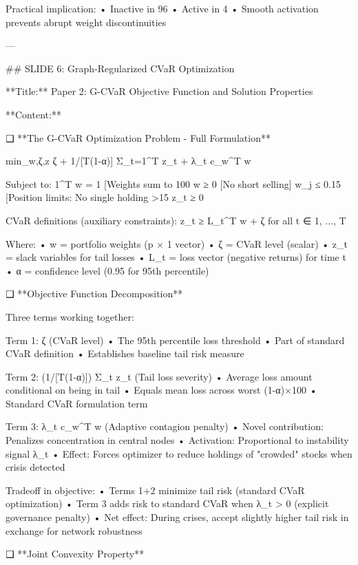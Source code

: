 Practical implication:
   • Inactive in 96%
   • Active in 4%
   • Smooth activation prevents abrupt weight discontinuities

---

## SLIDE 6: Graph-Regularized CVaR Optimization

**Title:** Paper 2: G-CVaR Objective Function and Solution Properties

**Content:**

❑ **The G-CVaR Optimization Problem - Full Formulation**

min_{w,ζ,z} ζ + 1/[T(1-α)] Σ_{t=1}^T z_t + λ_t c_w^T w

Subject to:
   1^T w = 1  [Weights sum to 100%
   w ≥ 0      [No short selling]
   w_j ≤ 0.15 [Position limits: No single holding >15%
   z_t ≥ 0

CVaR definitions (auxiliary constraints):
   z_t ≥ L_t^T w + ζ   for all t ∈ {1, ..., T}

Where:
   • w = portfolio weights (p × 1 vector)
   • ζ = CVaR level (scalar)
   • z_t = slack variables for tail losses
   • L_t = loss vector (negative returns) for time t
   • α = confidence level (0.95 for 95th percentile)

❑ **Objective Function Decomposition**

Three terms working together:

Term 1: ζ (CVaR level)
   • The 95th percentile loss threshold
   • Part of standard CVaR definition
   • Establishes baseline tail risk measure

Term 2: (1/[T(1-α)]) Σ_t z_t (Tail loss severity)
   • Average loss amount conditional on being in tail
   • Equals mean loss across worst (1-α)×100%
   • Standard CVaR formulation term

Term 3: λ_t c_w^T w (Adaptive contagion penalty)
   • Novel contribution: Penalizes concentration in central nodes
   • Activation: Proportional to instability signal λ_t
   • Effect: Forces optimizer to reduce holdings of "crowded" stocks when crisis detected

Tradeoff in objective:
   • Terms 1+2 minimize tail risk (standard CVaR optimization)
   • Term 3 adds risk to standard CVaR when λ_t > 0 (explicit governance penalty)
   • Net effect: During crises, accept slightly higher tail risk in exchange for network robustness

❑ **Joint Convexity Property**

